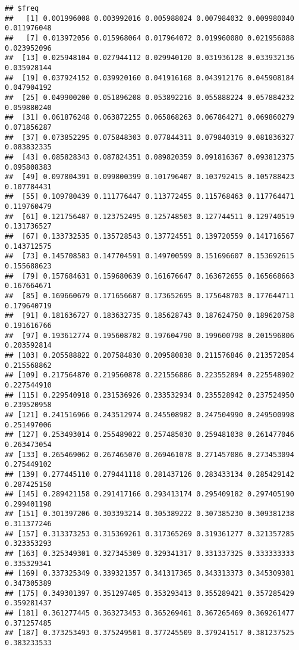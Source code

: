 \documentclass[
]{article}
\begin{document}
\begin{verbatim}
## $freq
##   [1] 0.001996008 0.003992016 0.005988024 0.007984032 0.009980040 0.011976048
##   [7] 0.013972056 0.015968064 0.017964072 0.019960080 0.021956088 0.023952096
##  [13] 0.025948104 0.027944112 0.029940120 0.031936128 0.033932136 0.035928144
##  [19] 0.037924152 0.039920160 0.041916168 0.043912176 0.045908184 0.047904192
##  [25] 0.049900200 0.051896208 0.053892216 0.055888224 0.057884232 0.059880240
##  [31] 0.061876248 0.063872255 0.065868263 0.067864271 0.069860279 0.071856287
##  [37] 0.073852295 0.075848303 0.077844311 0.079840319 0.081836327 0.083832335
##  [43] 0.085828343 0.087824351 0.089820359 0.091816367 0.093812375 0.095808383
##  [49] 0.097804391 0.099800399 0.101796407 0.103792415 0.105788423 0.107784431
##  [55] 0.109780439 0.111776447 0.113772455 0.115768463 0.117764471 0.119760479
##  [61] 0.121756487 0.123752495 0.125748503 0.127744511 0.129740519 0.131736527
##  [67] 0.133732535 0.135728543 0.137724551 0.139720559 0.141716567 0.143712575
##  [73] 0.145708583 0.147704591 0.149700599 0.151696607 0.153692615 0.155688623
##  [79] 0.157684631 0.159680639 0.161676647 0.163672655 0.165668663 0.167664671
##  [85] 0.169660679 0.171656687 0.173652695 0.175648703 0.177644711 0.179640719
##  [91] 0.181636727 0.183632735 0.185628743 0.187624750 0.189620758 0.191616766
##  [97] 0.193612774 0.195608782 0.197604790 0.199600798 0.201596806 0.203592814
## [103] 0.205588822 0.207584830 0.209580838 0.211576846 0.213572854 0.215568862
## [109] 0.217564870 0.219560878 0.221556886 0.223552894 0.225548902 0.227544910
## [115] 0.229540918 0.231536926 0.233532934 0.235528942 0.237524950 0.239520958
## [121] 0.241516966 0.243512974 0.245508982 0.247504990 0.249500998 0.251497006
## [127] 0.253493014 0.255489022 0.257485030 0.259481038 0.261477046 0.263473054
## [133] 0.265469062 0.267465070 0.269461078 0.271457086 0.273453094 0.275449102
## [139] 0.277445110 0.279441118 0.281437126 0.283433134 0.285429142 0.287425150
## [145] 0.289421158 0.291417166 0.293413174 0.295409182 0.297405190 0.299401198
## [151] 0.301397206 0.303393214 0.305389222 0.307385230 0.309381238 0.311377246
## [157] 0.313373253 0.315369261 0.317365269 0.319361277 0.321357285 0.323353293
## [163] 0.325349301 0.327345309 0.329341317 0.331337325 0.333333333 0.335329341
## [169] 0.337325349 0.339321357 0.341317365 0.343313373 0.345309381 0.347305389
## [175] 0.349301397 0.351297405 0.353293413 0.355289421 0.357285429 0.359281437
## [181] 0.361277445 0.363273453 0.365269461 0.367265469 0.369261477 0.371257485
## [187] 0.373253493 0.375249501 0.377245509 0.379241517 0.381237525 0.383233533

\end{verbatim}
\end{document}
